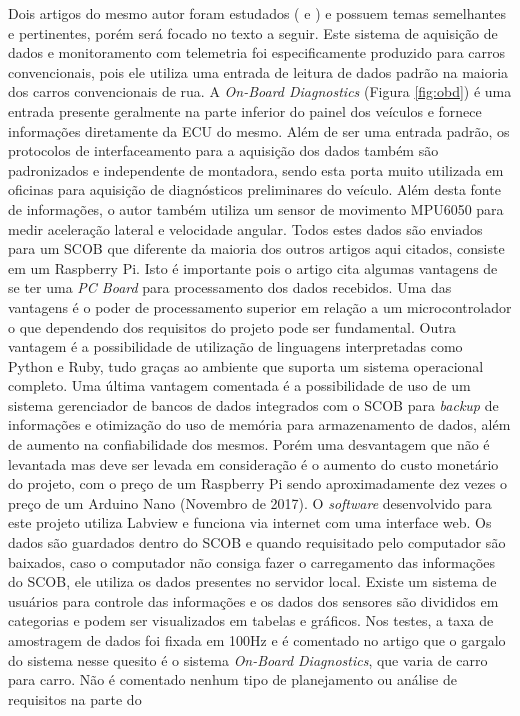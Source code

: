 
Dois artigos do mesmo autor foram estudados (\cite{designAndImplementation2015} e \cite{developmentOfAn2016}) e possuem temas semelhantes e pertinentes, porém  será focado no texto a seguir.
Este sistema de aquisição de dados e monitoramento com telemetria foi especificamente produzido para carros convencionais, pois ele utiliza uma entrada de leitura de dados padrão na maioria dos carros convencionais de rua. A \textit{On-Board Diagnostics} (Figura \ref{fig:obd}) é uma entrada presente geralmente na parte inferior do painel dos veículos e fornece informações diretamente da ECU do mesmo. Além de ser uma entrada padrão, os protocolos de interfaceamento para a aquisição dos dados também são padronizados e independente de montadora, sendo esta porta muito utilizada em oficinas para aquisição de diagnósticos preliminares do veículo. Além desta fonte de informações, o autor também utiliza um sensor de movimento MPU6050 para medir aceleração lateral e velocidade angular. Todos estes dados são enviados para um SCOB que diferente da maioria dos outros artigos aqui citados, consiste em um Raspberry Pi. Isto é importante pois o artigo cita algumas vantagens de se ter uma \textit{PC Board} para processamento dos dados recebidos. Uma das vantagens é o poder de processamento superior em relação a um microcontrolador o que dependendo dos requisitos do projeto pode ser fundamental. Outra vantagem é a possibilidade de utilização de linguagens interpretadas como Python e Ruby, tudo graças ao ambiente que suporta um sistema operacional completo. Uma última vantagem comentada é a possibilidade de uso de um sistema gerenciador de bancos de dados integrados com o SCOB para \textit{backup} de informações e otimização do uso de memória para armazenamento de dados, além de aumento na confiabilidade dos mesmos. Porém uma desvantagem que não é levantada mas deve ser levada em consideração é o aumento do custo monetário do projeto, com o preço de um Raspberry Pi sendo aproximadamente dez vezes o preço de um Arduino Nano (Novembro de 2017). O \textit{software} desenvolvido para este projeto utiliza Labview e funciona via internet com uma interface web. Os dados são guardados dentro do SCOB e quando requisitado pelo computador são baixados, caso o computador não consiga fazer o carregamento das informações do SCOB, ele utiliza os dados presentes no servidor local. Existe um sistema de usuários para controle das informações e os dados dos sensores são divididos em categorias e podem ser visualizados em tabelas e gráficos. Nos testes, a taxa de amostragem de dados foi fixada em 100Hz e é comentado no artigo que o gargalo do sistema nesse quesito é o sistema \textit{On-Board Diagnostics}, que varia de carro para carro. Não é comentado nenhum tipo de planejamento ou análise de requisitos na parte do 